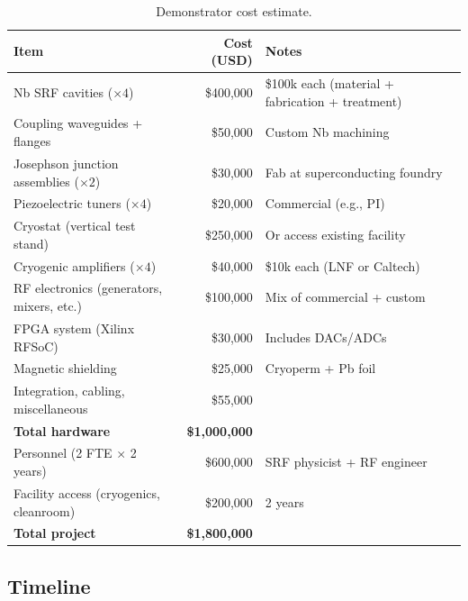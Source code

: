 \documentclass[12pt,a4paper]{article}
\begin{document}
\begin{table}[H]
\centering
\caption{Demonstrator cost estimate.}
\begin{tabular}{lrl}
\toprule
\textbf{Item} & \textbf{Cost (USD)} & \textbf{Notes} \\
\midrule
Nb SRF cavities ($\times 4$) & \$400{,}000 & \$100k each (material + fabrication + treatment) \\
Coupling waveguides + flanges & \$50{,}000 & Custom Nb machining \\
Josephson junction assemblies ($\times 2$) & \$30{,}000 & Fab at superconducting foundry \\
Piezoelectric tuners ($\times 4$) & \$20{,}000 & Commercial (e.g., PI) \\
Cryostat (vertical test stand) & \$250{,}000 & Or access existing facility \\
Cryogenic amplifiers ($\times 4$) & \$40{,}000 & \$10k each (LNF or Caltech) \\
RF electronics (generators, mixers, etc.) & \$100{,}000 & Mix of commercial + custom \\
FPGA system (Xilinx RFSoC) & \$30{,}000 & Includes DACs/ADCs \\
Magnetic shielding & \$25{,}000 & Cryoperm + Pb foil \\
Integration, cabling, miscellaneous & \$55{,}000 & \\
\midrule
\textbf{Total hardware} & \textbf{\$1{,}000{,}000} & \\
\midrule
Personnel (2 FTE $\times$ 2 years) & \$600{,}000 & SRF physicist + RF engineer \\
Facility access (cryogenics, cleanroom) & \$200{,}000 & 2 years \\
\midrule
\textbf{Total project} & \textbf{\$1{,}800{,}000} & \\
\bottomrule
\end{tabular}
\end{table}

\subsection{Timeline}
\end{document}
